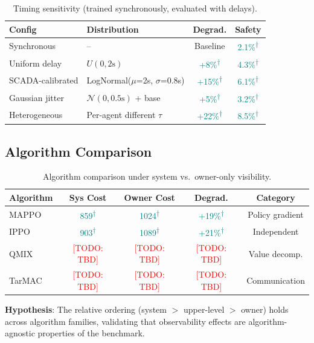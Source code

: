 \documentclass{article}
\newcommand{\todo}[1]{\textcolor{red}{[TODO: #1]}}
\newcommand{\exampleval}[1]{\textcolor{teal}{#1}\textsuperscript{\textcolor{teal}{$\dagger$}}}
\begin{document}
\begin{table}[h]
\centering
\caption{Timing sensitivity (trained synchronously, evaluated with delays).}
\label{tab:timing}
\small
\begin{tabular}{@{}llcc@{}}
\toprule
\textbf{Config} & \textbf{Distribution} & \textbf{Degrad.} & \textbf{Safety} \\
\midrule
Synchronous & -- & Baseline & \exampleval{2.1\%} \\
Uniform delay & $U(0, 2\text{s})$ & \exampleval{+8\%} & \exampleval{4.3\%} \\
SCADA-calibrated & LogNormal($\mu$=2s, $\sigma$=0.8s) & \exampleval{+15\%} & \exampleval{6.1\%} \\
Gaussian jitter & $\mathcal{N}(0, 0.5\text{s})$ + base & \exampleval{+5\%} & \exampleval{3.2\%} \\
Heterogeneous & Per-agent different $\tau$ & \exampleval{+22\%} & \exampleval{8.5\%} \\
\bottomrule
\end{tabular}
\end{table}

\subsection{Algorithm Comparison}

\begin{table}[h]
\centering
\caption{Algorithm comparison under system vs.\ owner-only visibility.}
\label{tab:algorithms}
\small
\begin{tabular}{@{}lcccc@{}}
\toprule
\textbf{Algorithm} & \textbf{Sys Cost} & \textbf{Owner Cost} & \textbf{Degrad.} & \textbf{Category} \\
\midrule
MAPPO & \exampleval{859} & \exampleval{1024} & \exampleval{+19\%} & Policy gradient \\
IPPO & \exampleval{903} & \exampleval{1089} & \exampleval{+21\%} & Independent \\
QMIX & \todo{TBD} & \todo{TBD} & \todo{TBD} & Value decomp. \\
TarMAC & \todo{TBD} & \todo{TBD} & \todo{TBD} & Communication \\
\bottomrule
\end{tabular}
\end{table}

\textbf{Hypothesis}: The relative ordering (system $>$ upper-level $>$ owner) holds across algorithm families, validating that observability effects are algorithm-agnostic properties of the benchmark.
\end{document}
